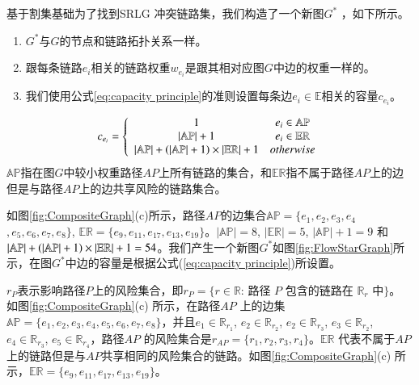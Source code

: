 基于割集基础为了找到SRLG 冲突链路集，我们构造了一个新图$G^*$ ，如下所示。
\begin{enumerate}
  \item $G^*$与$G$的节点和链路拓扑关系一样。
  \item 跟每条链路$e_i$相关的链路权重$w_{e_i}$是跟其相对应图$G$中边的权重一样的。
  \item 我们使用公式\ref{eq:capacity principle}的准则设置每条边$e_i \in \mathbb{E}$相关的容量$c_{e_i}$。
\end{enumerate}
\begin{equation}
c_{e_i} = \left\{ {\begin{array}{*{20}{c}}
   1 & {e_i{\rm{ }} \in {\rm{ \mathbb{AP}}}}  \\
   {\left| \mathbb{AP} \right|+1} & {e_i{\rm{ }} \in {\rm{ \mathbb{E}}}{{\rm{\mathbb{R}}}}}  \\
   {\left| {{\rm\mathbb{AP}}} \right| + \left( {\left| {{\rm\mathbb{AP}}} \right| + 1} \right)\times \left| {{\rm{\mathbb{E}}}{{\rm{\mathbb{R}}}}} \right| + 1} & {otherwise}  \\
\end{array}} \right.
\label{eq:capacity principle}
\end{equation}
$\mathbb{AP}$指在图$G$中较小权重路径$AP$上所有链路的集合，和$\mathbb{\mathbb{ER}}$指不属于路径$AP$上的边但是与路径$AP$上的边共享风险的链路集合。

如图\ref{fig:CompositeGraph}(c)所示，路径$AP$的边集合$\mathbb{AP}=\{e_1,e_2,e_3,e_4$
$,e_5,e_6,e_7,e_8\}$, $\mathbb{\mathbb{ER}}=\{e_9,e_{11},e_{17},e_{13},e_{19}\}$。$|\mathbb{AP}|=8$, $|\mathbb{\mathbb{ER}}|=5$, $|\mathbb{AP}|+1=9$ 和 ${\left| {{\rm{\mathbb{AP}}}} \right| + \left( {\left| {{\rm{\mathbb{AP}}}} \right| + 1} \right)\times \left| {{\rm{\mathbb{E}}}{{\rm{\mathbb{R}}}}} \right| + 1}=54$。我们产生一个新图$G^*$如图\ref{fig:FlowStarGraph}所示，在图$G^*$中边的容量是根据公式(\ref{eq:capacity principle})所设置。

$r_P$表示影响路径$P$上的风险集合，即$r_P=\{r\in \mathbb{R}$: 路径 $P$ 包含的链路在 $\mathbb{R}_r$ 中$\}$。 如图\ref{fig:CompositeGraph}(c) 所示，在路径$AP$ 上的边集$\mathbb{AP}=\{e_1,e_2,e_3,e_4,e_5,e_6,e_7,e_8\}$，并且$e_1\in \mathbb{R}_{r_1}$, $e_2\in \mathbb{R}_{r_2}$, $e_2\in \mathbb{R}_{r_3}$, $e_3\in \mathbb{R}_{r_2}$, $e_4\in \mathbb{R}_{r_3}$, $e_5\in \mathbb{R}_{r_4}$，路径$AP$ 的风险集合是${r}_{{AP}}=\{r_1, r_2, r_3, r_4\}$。$\mathbb{\mathbb{ER}}$ 代表不属于$AP$上的链路但是与$AP$共享相同的风险集合的链路。如图\ref{fig:CompositeGraph}(c) 所示，$\mathbb{\mathbb{ER}}=\{e_9,e_{11},e_{17},e_{13},e_{19}\}$。

